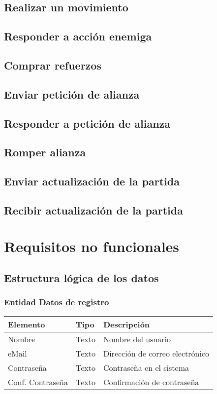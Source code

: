 \subsection{Realizar un movimiento}

\subsection{Responder a acción enemiga}

\subsection{Comprar refuerzos}

\subsection{Enviar petición de alianza}

\subsection{Responder a petición de alianza}

\subsection{Romper alianza}

\subsection{Enviar actualización de la partida}

\subsection{Recibir actualización de la partida}

\section{Requisitos no funcionales}

\subsection{Estructura lógica de los datos}

\subsubsection{Entidad Datos de registro}
\begin{tabularx}{0.9\textwidth}{llX}
\hline
\textbf{Elemento} & \textbf{Tipo} & \textbf{Descripción} \\
\hline
Nombre & Texto & Nombre del usuario \\
eMail & Texto & Dirección de correo electrónico \\
Contraseña & Texto & Contraseña en el sistema \\
Conf. Contraseña & Texto & Confirmación de contraseña \\
\hline
\end{tabularx}
